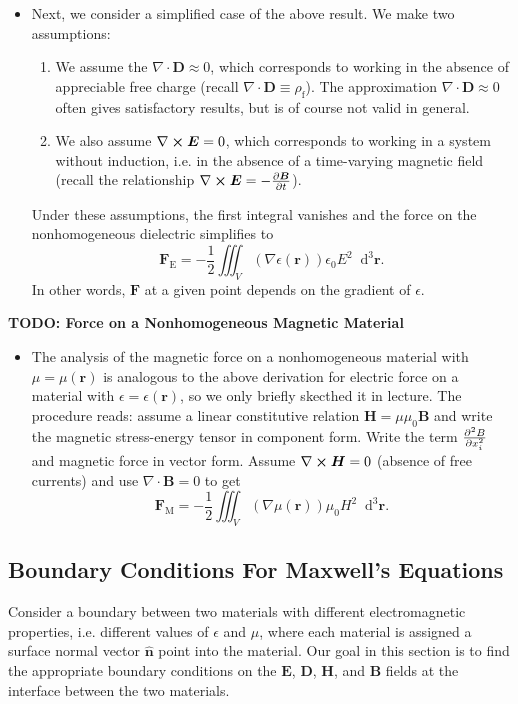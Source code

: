 \documentclass[11pt, a4paper]{article}
\newcommand{\diff}{\mathop{}\!\mathrm{d}} %
\newcommand{\dr}{\diff^{3} \r}  %
\renewcommand{\vec}[1]{\bm{#1}} %
\newcommand{\uvec}[1]{\hat{\vec{#1}}} %
\renewcommand{\r}{\vec{r}}
\newcommand{\E}{\vec{E}} %
\newcommand{\D}{\vec{D}}  %
\newcommand{\B}{\vec{B}} %
\renewcommand{\H}{\vec{H}}  %
\newcommand{\e}{\epsilon}
\newcommand{\ee}{\epsilon_{0}}  %
\newcommand{\mm}{\mu_{0}}  %
\renewcommand{\div}{\nabla \cdot}
\renewcommand{\curl}{\nabla \cross}
\renewcommand{\grad}{\nabla}
\begin{document}
\begin{itemize}
	\item Next, we consider a simplified case of the above result. We make two assumptions:
    \begin{enumerate}
        \item We assume the $ \div \D \approx 0 $, which corresponds to working in the absence of appreciable free charge (recall $ \div \D \equiv \rho_{\text{f}} $). The approximation $ \div \D \approx 0 $ often gives satisfactory results, but is of course not valid in general.
        
        \item We also assume $ \curl \E = 0 $, which corresponds to working in a system without induction, i.e. in the absence of a time-varying magnetic field (recall the relationship $ \curl \E = - \pdv{\B}{t} $).
    \end{enumerate}
    Under these assumptions, the first integral vanishes and the force on the nonhomogeneous dielectric simplifies to
	\begin{equation*}
		\vec{F}_{\text{E}} = - \frac{1}{2}\iiint_{V}(\grad \e(\r))\ee E^{2}\dr.
	\end{equation*}
	In other words, $ \vec{F} $ at a given point depends on the gradient of $ \e $. 
	
	
\end{itemize}

\textbf{TODO: Force on a Nonhomogeneous Magnetic Material}
\begin{itemize}
    \item The analysis of the magnetic force on a nonhomogeneous material with $ \mu = \mu(\r) $ is analogous to the above derivation for electric force on a material with $ \e = \e(\r) $, so we only briefly skecthed it in lecture. The procedure reads: assume a linear constitutive relation $ \H = \mu \mm \B $ and write the magnetic stress-energy tensor in component form. Write the term $ \pdv[2]{B}{x_{i}} $ and magnetic force in vector form. Assume $ \curl \H = 0 $ (absence of free currents) and use $ \div \B = 0 $ to get
	\begin{equation*}
		\vec{F}_{\text{M}} = -\frac{1}{2}\iiint_{V} (\grad \mu(\r))\mm H^{2}\dr.
	\end{equation*}
\end{itemize}


\subsection{Boundary Conditions For Maxwell's Equations}
Consider a boundary between two materials with different electromagnetic properties, i.e. different values of $ \epsilon $ and $ \mu $, where each material is assigned a surface normal vector $ \uvec{n} $ point into the material. Our goal in this section is to find the appropriate boundary conditions on the $ \E $, $ \D $, $ \H $, and $ \B $ fields at the interface between the two materials.
\end{document}
